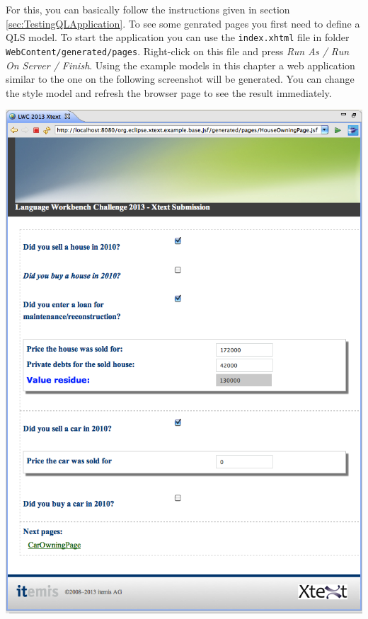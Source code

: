 For this, you can basically follow the instructions given in section
\ref{sec:TestingQLApplication}. To see some genrated pages you first need to
define a QLS model. To start the application you can use the
\texttt{index.xhtml} file in folder \texttt{WebContent/generated/pages}.
Right-click on this file and press \emph{Run As / Run On Server / Finish}. Using
the example models in this chapter a web application similar to the one on the
following screenshot will be generated. You can change the style model and
refresh the browser page to see the result immediately.

\begin{center}
\includegraphics[width=17cm]{./images/chapter03/qls_application.png}
\end{center}


